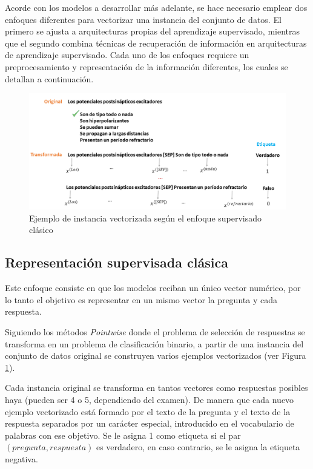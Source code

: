 Acorde con los modelos a desarrollar más adelante, se hace necesario emplear dos enfoques diferentes para vectorizar una instancia del conjunto de datos. El primero se ajusta a arquitecturas propias del aprendizaje supervisado, mientras que el segundo combina técnicas de recuperación de información en arquitecturas de aprendizaje supervisado. Cada uno de los enfoques requiere un preprocesamiento y representación de la información diferentes, los cuales se detallan a continuación.

\begin{figure}[!t]
  \begin{center}
    \includegraphics[angle=0, width=1\textwidth]{Graphics/vect_1.png}
  \end{center}
    \caption{Ejemplo de instancia vectorizada según el enfoque supervisado clásico}\label{vect_1}
\end{figure}

\subsection{Representación supervisada clásica}

Este enfoque consiste en que los modelos reciban un único vector numérico, por lo tanto el objetivo es representar en un mismo vector la pregunta y cada respuesta.

Siguiendo los métodos \textit{Pointwise} donde el problema de selección de respuestas se transforma en un problema de clasificación binario, a partir de una instancia del conjunto de datos original se construyen varios ejemplos vectorizados (ver Figura \ref{vect_1}). 

Cada instancia original se transforma en tantos vectores como respuestas posibles haya (pueden ser 4 o 5, dependiendo del examen). De manera que cada nuevo ejemplo vectorizado está formado por el texto de la pregunta y el texto de la respuesta separados por un carácter especial, introducido en el vocabulario de palabras con ese objetivo. Se le asigna 1 como etiqueta si el par $(pregunta, respuesta)$ es verdadero, en caso contrario, se le asigna la etiqueta negativa.


